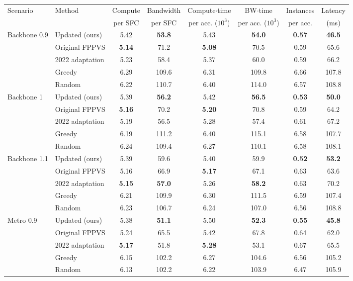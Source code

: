 \begin{tabular}{llcccccc}
\toprule
Scenario & Method & Compute & Bandwidth & Compute$\cdot$time & BW$\cdot$time & Instances & Latency \\
 & & per SFC & per SFC & per acc. ($10^3$) & per acc. ($10^3$) & per acc. & (ms) \\
\midrule
Backbone 0.9 & Updated (ours) & 5.42 & \textbf{53.8} & 5.43 & \textbf{54.0} & \textbf{0.57} & \textbf{46.5} \\
 & Original FPPVS & \textbf{5.14} & 71.2 & \textbf{5.08} & 70.5 & 0.59 & 65.6 \\
 & 2022 adaptation & 5.23 & 58.4 & 5.37 & 60.0 & 0.59 & 66.2 \\
 & Greedy & 6.29 & 109.6 & 6.31 & 109.8 & 6.66 & 107.8 \\
 & Random & 6.22 & 110.7 & 6.40 & 114.0 & 6.57 & 108.8 \\
\midrule
Backbone 1 & Updated (ours) & 5.39 & \textbf{56.2} & 5.42 & \textbf{56.5} & \textbf{0.53} & \textbf{50.0} \\
 & Original FPPVS & \textbf{5.16} & 70.2 & \textbf{5.20} & 70.8 & 0.59 & 64.2 \\
 & 2022 adaptation & 5.19 & 56.5 & 5.28 & 57.4 & 0.61 & 67.2 \\
 & Greedy & 6.19 & 111.2 & 6.40 & 115.1 & 6.58 & 107.7 \\
 & Random & 6.24 & 109.4 & 6.27 & 110.1 & 6.58 & 108.1 \\
\midrule
Backbone 1.1 & Updated (ours) & 5.39 & 59.6 & 5.40 & 59.9 & \textbf{0.52} & \textbf{53.2} \\
 & Original FPPVS & 5.16 & 66.9 & \textbf{5.17} & 67.1 & 0.63 & 63.6 \\
 & 2022 adaptation & \textbf{5.15} & \textbf{57.0} & 5.26 & \textbf{58.2} & 0.63 & 70.2 \\
 & Greedy & 6.21 & 109.9 & 6.30 & 111.5 & 6.59 & 107.4 \\
 & Random & 6.23 & 106.7 & 6.24 & 107.0 & 6.56 & 108.8 \\
\midrule
Metro 0.9 & Updated (ours) & 5.38 & \textbf{51.1} & 5.50 & \textbf{52.3} & \textbf{0.55} & \textbf{45.8} \\
 & Original FPPVS & 5.24 & 65.5 & 5.42 & 67.8 & 0.64 & 62.0 \\
 & 2022 adaptation & \textbf{5.17} & 51.8 & \textbf{5.28} & 53.1 & 0.67 & 65.5 \\
 & Greedy & 6.15 & 102.2 & 6.27 & 104.6 & 6.56 & 105.2 \\
 & Random & 6.13 & 102.2 & 6.22 & 103.9 & 6.47 & 105.9 \\

\end{tabular}
